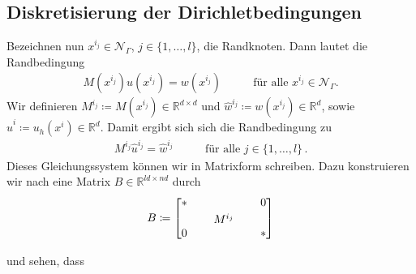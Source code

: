 \documentclass{scrartcl}
\newcommand{\tikzmark}[3][]{\tikz[remember picture,baseline] \node [anchor=base,#1](#2) {$#3$};}
\def\R{\mathbb{R}}
\newcommand{\cN}{\mathcal{N}}
\newcommand{\hu}{\hat{u}}
\newcommand{\hv}{\hat{v}}
\newcommand{\hw}{\hat{w}}
\newcommand{\vect}[1]{\begin{bmatrix} #1 \end{bmatrix}}
\begin{document}
\subsection{Diskretisierung der Dirichletbedingungen}
Bezeichnen nun $x^{i_j}\in\cN_\Gamma$, $j\in\{1,\dots,l\}$, die Randknoten. Dann lautet die Randbedingung
\begin{align*}
	M(x^{i_j})u(x^{i_j}) = w(x^{i_j}) \qquad&\text{für alle } x^{i_j}\in\cN_\Gamma.
\end{align*}
Wir definieren $M^{i_j}\coloneqq M(x^{i_j})\in\R^{d\times d}$ und $\hw^{i_j}\coloneqq w(x^{i_j})\in\R^d$, sowie $\hu^{i}\coloneqq u_h(x^{i})\in\R^d$. 
Damit ergibt sich sich die Randbedingung zu
\begin{align*}
	M^{i_j}\hu^{i_j} = \hw^{i_j} \qquad&\text{für alle } j\in\{1,\dots,l\}\,.
\end{align*}
Dieses Gleichungssystem können wir in Matrixform schreiben. Dazu konstruieren wir nach \cite[S.250f.]{Alb-2002} eine Matrix $B\in\R^{ld\times nd}$ durch
\begin{align*}
	B\coloneqq
	\begin{bmatrix}
		*\quad & & \quad0 \\
		& \tikzmark{KonstruktionBDiskretisierung}{M^{i_j}} & \\
		0\quad & & \quad*
	\end{bmatrix} \\
\end{align*}
%
und sehen, dass
\end{document}
